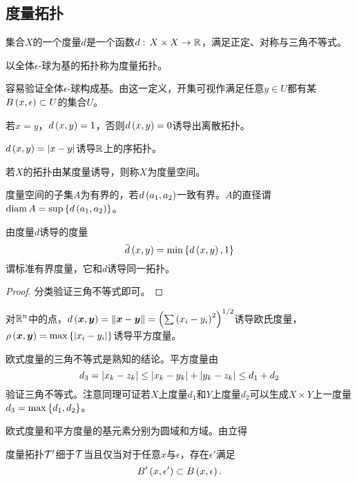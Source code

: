 \documentclass{ctexrep}
\begin{document}
  \subsection{度量拓扑}
  \begin{definition}
    集合$X$的一个度量$d$是一个函数$d:\, X\times X \rightarrow \mathbb{R}$，满足正定、对称与三角不等式。
  \end{definition}
  \begin{definition}
    以全体$\epsilon$-球为基的拓扑称为度量拓扑。
  \end{definition}
  容易验证全体$\epsilon$-球构成基。由这一定义，开集可视作满足任意$y\in U$都有某$B\left(x,\epsilon\right)\subset U$的集合$U$。
  \begin{ex}
    若$x=y$，$d\left(x,y\right)=1$，否则$d\left(x,y\right)=0$诱导出离散拓扑。
  \end{ex}
  \begin{ex}
    $d\left(x,y\right)=\abs{x-y}$诱导$\mathbb{R}$上的序拓扑。
  \end{ex}
  \begin{definition}
    若$X$的拓扑由某度量诱导，则称$X$为度量空间。
  \end{definition}
  \begin{definition}
    度量空间的子集$A$为有界的，若$d\left(a_1,a_2\right)$一致有界。$A$的直径谓$\mathrm{diam}\, A = \sup\left\{d\left(a_1,a_2\right)\right\}$。
  \end{definition}
  \begin{theorem}
    \label{thm:sbmeqm}
    由度量$d$诱导的度量
    \[ \sbm{d}\pare{x,y} = \min\curb{d\pare{x,y}, 1} \]
    谓标准有界度量，它和$d$诱导同一拓扑。
  \end{theorem}
  \begin{proof}
    分类验证三角不等式即可。
  \end{proof}
  \begin{definition}
    对$\mathbb{R}^n$中的点，$d\left(\boldsymbol{x},\boldsymbol{y}\right) = \norm{\boldsymbol{x}-\boldsymbol{y}} = \left(\sum\left(x_i-y_i\right)^2\right)^{1/2}$诱导欧氏度量，$\rho\left(\boldsymbol{x},\boldsymbol{y}\right) = \max\left\{\abs{x_i-y_i}\right\}$诱导平方度量。
  \end{definition}
  欧式度量的三角不等式是熟知的结论。平方度量由
  \[ d_3 = \abs{x_k-z_k} \le \abs{x_k-y_k} + \abs{y_k-z_k} \le d_1 + d_2 \]
  验证三角不等式。注意同理可证若$X$上度量$d_1$和$Y$上度量$d_2$可以生成$X\times Y$上一度量$d_3 = \max\left\{d_1,d_2\right\}$。
  \par
  欧式度量和平方度量的基元素分别为圆域和方域。由立得
  \begin{theorem}
    度量拓扑$\mathcal{T}'$细于$\mathcal{T}$当且仅当对于任意$x$与$\epsilon$，存在$\epsilon'$满足
    \[ B'\left(x,\epsilon'\right) \subset B\left(x, \epsilon\right). \]
  \end{theorem}
\end{document}

